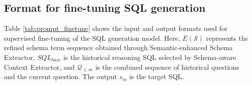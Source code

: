 \documentclass[11pt]{article}
\begin{document}

\subsection{Format for fine-tuning SQL generation}
\label{sec:Format for fine-tuning SQL generation}
Table \ref{tab:prompt_finetune} shows the input and output formats used for supervised fine-tuning of the SQL generation model. Here, $E(\mathcal{S})$ represents the refined schema term sequence obtained through Semantic-enhanced Schema Extractor, $SQL_{base}$ is the historical reasoning SQL selected by Schema-aware Context Extractor, and $\mathcal{Q}_{ \leq m}$ is the combined sequence of historical questions and the current question. The output $s_{m}$ is the target SQL.
\end{document}
